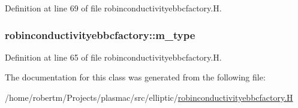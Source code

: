 Definition at line 69 of file robinconductivityebbcfactory.\+H.

\subsubsection[{\texorpdfstring{m\+\_\+type}{m_type}}]{ robinconductivityebbcfactory\+::m\+\_\+type\hspace{0.3cm}{\ttfamily [protected]}}\hypertarget{classrobinconductivityebbcfactory_abaf68b0f5590d6a643df52fd6518fb91}{}\label{classrobinconductivityebbcfactory_abaf68b0f5590d6a643df52fd6518fb91}


Definition at line 65 of file robinconductivityebbcfactory.\+H.



The documentation for this class was generated from the following file\+:\begin{DoxyCompactItemize}
\item 
/home/robertm/\+Projects/plasmac/src/elliptic/\hyperlink{robinconductivityebbcfactory_8H}{robinconductivityebbcfactory.\+H}\end{DoxyCompactItemize}
